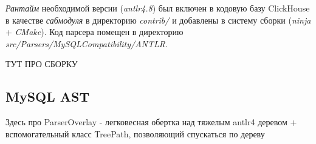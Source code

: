 \textit{Рантайм} необходимой версии (\textit{antlr4.8}) был включен в кодовую базу ClickHouse в качестве \textit{сабмодуля} в директорию \textit{contrib/} и добавлены в систему сборки (\textit{ninja} + \textit{CMake}). Код парсера помещен в директорию\\ \textit{src/Parsers/MySQLCompatibility/ANTLR}.

ТУТ ПРО СБОРКУ
\subsection{MySQL AST}
Здесь про ParserOverlay - легковесная обертка над тяжелым antlr4 деревом + вспомогательный класс TreePath, позволяющий спускаться по дереву

\pagebreak
